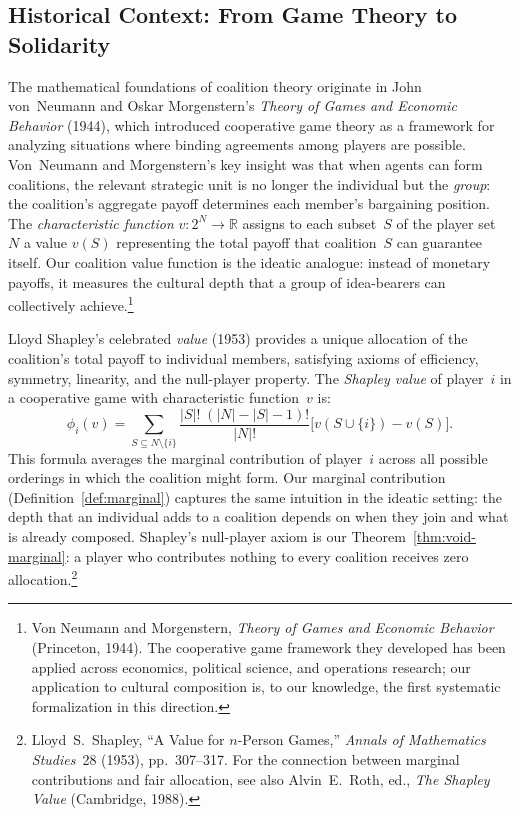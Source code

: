 \subsection{Historical Context: From Game Theory to Solidarity}

The mathematical foundations of coalition theory originate in John von~Neumann
and Oskar Morgenstern's \textit{Theory of Games and Economic Behavior}
(1944), which introduced cooperative game theory as a framework for analyzing
situations where binding agreements among players are possible.  Von~Neumann
and Morgenstern's key insight was that when agents can form coalitions, the
relevant strategic unit is no longer the individual but the \emph{group}:
the coalition's aggregate payoff determines each member's bargaining position.
The \emph{characteristic function} $v: 2^N \to \mathbb{R}$ assigns to each
subset~$S$ of the player set~$N$ a value $v(S)$ representing the total payoff
that coalition~$S$ can guarantee itself.  Our coalition value function is
the ideatic analogue: instead of monetary payoffs, it measures the cultural
depth that a group of idea-bearers can collectively achieve.\footnote{Von
Neumann and Morgenstern, \textit{Theory of Games and Economic Behavior}
(Princeton, 1944).  The cooperative game framework they developed has been
applied across economics, political science, and operations research; our
application to cultural composition is, to our knowledge, the first
systematic formalization in this direction.}

Lloyd Shapley's celebrated \emph{value} (1953) provides a unique allocation
of the coalition's total payoff to individual members, satisfying axioms of
efficiency, symmetry, linearity, and the null-player property.  The
\emph{Shapley value} of player~$i$ in a cooperative game with characteristic
function~$v$ is:
\[
  \phi_i(v) = \sum_{S \subseteq N \setminus \{i\}}
  \frac{|S|!\;(|N| - |S| - 1)!}{|N|!}
  \bigl[v(S \cup \{i\}) - v(S)\bigr].
\]
This formula averages the marginal contribution of player~$i$ across all
possible orderings in which the coalition might form.  Our marginal
contribution (Definition~\ref{def:marginal}) captures the same intuition in
the ideatic setting: the depth that an individual adds to a coalition depends
on when they join and what is already composed.  Shapley's null-player axiom
is our Theorem~\ref{thm:void-marginal}: a player who contributes nothing to
every coalition receives zero allocation.\footnote{Lloyd~S.\ Shapley, ``A
Value for $n$-Person Games,'' \textit{Annals of Mathematics Studies}~28
(1953), pp.\ 307--317.  For the connection between marginal contributions
and fair allocation, see also Alvin~E.\ Roth, ed., \textit{The Shapley
Value} (Cambridge, 1988).}


